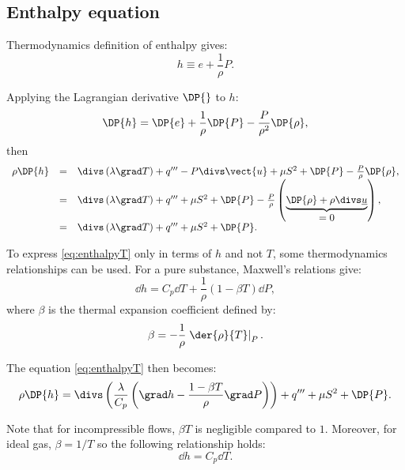 \subsection{Enthalpy equation}

Thermodynamics definition of enthalpy gives:
\begin{equation}
 h \equiv e+ \dfrac{1}{\rho} P.
\end{equation}

Applying the Lagrangian derivative $\DP{}$ to $h$:
\begin{equation}
 \DP{h}=\DP{e}+\frac{1}{\rho}\DP{P}-\frac{P}{\rho^2}\DP{\rho},
\end{equation}
%
then
\begin{equation}\label{eq:enthalpyT}
\begin{array}{r c l}
  \rho \DP{h} &=& \divs \left( \lambda \grad T \right) +q'''-P\divs \vect{u} + \mu S^2 + \DP{P} -\frac{P}{\rho}\DP{\rho}, \\
   &=& \divs \left( \lambda \grad T \right) +q''' + \mu  S^2 + \DP{P} - \frac{P}{\rho} \left(\underbrace{\DP{\rho} + \rho \divs \underline{u}}_{\displaystyle =0} \right), \\
   &=& \divs \left( \lambda \grad T \right) +q''' + \mu  S^2 + \DP{P}. 
\end{array}
\end{equation}

To express \eqref{eq:enthalpyT} only in terms of $h$ and not $T$, some thermodynamics relationships can be used.
For a pure substance, Maxwell's relations give:
%
\begin{equation}\label{eq:goveqn:dh_dt_dp}
  \dd h=C_p \dd T + \frac{1}{\rho} \left( 1-\beta T \right)\dd P,
\end{equation}
%
where $\beta$ is the thermal expansion coefficient defined by:
\begin{equation}
 \beta= -\frac{1}{\rho}  \left.\der{\rho}{T}\right|_P.
\end{equation}

The equation \eqref{eq:enthalpyT} then becomes:
\begin{equation}\label{eq:enthalpyH}
 \rho \DP{h} = \divs \left( \dfrac{\lambda}{C_p} \left(\grad h -\dfrac{1-\beta T }{\rho}\grad P\right)\right) +q''' + \mu S^2 + \DP{P}.
\end{equation}

\begin{remark}
Note that for incompressible flows, $\beta T$ is negligible compared to $1$. Moreover, for ideal gas, $\beta = 1/T$ so the following relationship holds:
\begin{equation}
 \dd h=C_p \dd T.
\end{equation}
%
\end{remark}

